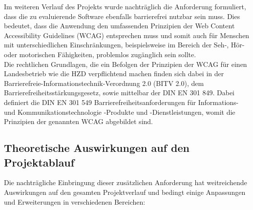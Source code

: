 \documentclass[ThesisDJ.tex]{subfiles}
\begin{document}
Im weiteren Verlauf des Projekts wurde nachträglich die Anforderung formuliert, dass die zu evaluierende Software ebenfalls barrierefrei nutzbar sein muss. Dies bedeutet, dass die Anwendung den umfassenden Prinzipien der Web Content Accessibility Guidelines (WCAG)\cite{Kirkpatrick2018WCAG21} entsprechen muss und somit auch für Menschen mit unterschiedlichen Einschränkungen, beispielsweise im Bereich der Seh-, Hör- oder motorischen Fähigkeiten, problemlos zugänglich sein sollte.\\
Die rechtlichen Grundlagen, die ein Befolgen der Prinzipien der WCAG für einen Landesbetrieb wie die HZD verpflichtend machen finden sich dabei in der Barrierefreie-Informationstechnik-Verordnung 2.0 (BITV 2.0)\cite{bitv2}, dem Barrierefreiheitsstärkungsgesetz\cite{bfsg}, sowie mittelbar der DIN EN 301 849\cite{din301549}. Dabei definiert die DIN EN 301 549 Barrierefreiheitsanforderungen für Informations- und Kommunikationstechnologie -Produkte und -Dienstleistungen, womit die Prinzipien der genannten WCAG abgebildet sind.

\subsection{Theoretische Auswirkungen auf den Projektablauf}
Die nachträgliche Einbringung dieser zusätzlichen Anforderung hat weitreichende Auswirkungen auf den gesamten Projektverlauf und bedingt einige Anpassungen und Erweiterungen in verschiedenen Bereichen:
\end{document}
